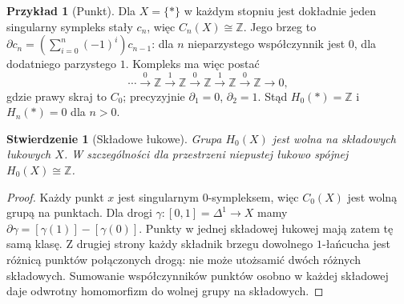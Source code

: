 \documentclass[11pt,a4paper,oneside]{report}
\newcommand{\Z}{\mathbb{Z}}
\theoremstyle{plain}
\newtheorem{stwierdzenie}[twierdzenie]{Stwierdzenie}
\theoremstyle{definition}
\newtheorem{przyklad}[twierdzenie]{Przykład}
\theoremstyle{remark}
\begin{document}
\begin{przyklad}[Punkt]
\label{prz:homologia-punktu}
Dla $X=\{*\}$ w każdym stopniu jest
dokładnie jeden singularny sympleks
stały $c_n$, więc $C_n(X)\cong\Z$.
Jego brzeg to
$\partial c_n=(\sum_{i=0}^n(-1)^i)c_{n-1}$:
dla $n$ nieparzystego współczynnik
jest $0$, dla dodatniego parzystego $1$.
Kompleks ma więc postać
\[
 \cdots\xrightarrow{\;0\;}\Z
 \xrightarrow{\;1\;}\Z
 \xrightarrow{\;0\;}\Z
 \xrightarrow{\;1\;}\Z
 \xrightarrow{\;0\;}\Z\longrightarrow0,
\]
gdzie prawy skraj to $C_0$; precyzyjnie
$\partial_1=0$, $\partial_2=1$.
Stąd $H_0(*)=\Z$ i $H_n(*)=0$ dla $n>0$.
\end{przyklad}

\begin{stwierdzenie}[Składowe łukowe]
\label{prop:h0-singularne}
Grupa $H_0(X)$ jest wolna na składowych
łukowych $X$. W szczególności
dla przestrzeni niepustej łukowo spójnej
$H_0(X)\cong\Z$.
\end{stwierdzenie}
\begin{proof}
Każdy punkt $x$ jest singularnym
$0$-sympleksem, więc $C_0(X)$
jest wolną grupą na punktach.
Dla drogi $\gamma:[0,1]=\Delta^1\to X$
mamy $\partial\gamma=[\gamma(1)]-
[\gamma(0)]$. Punkty w jednej składowej
łukowej mają zatem tę samą klasę.
Z drugiej strony każdy składnik
brzegu dowolnego $1$-łańcucha
jest różnicą punktów połączonych drogą:
nie może utożsamić dwóch różnych
składowych. Sumowanie współczynników
punktów osobno w każdej składowej
daje odwrotny homomorfizm do
wolnej grupy na składowych.
\end{proof}
\end{document}
